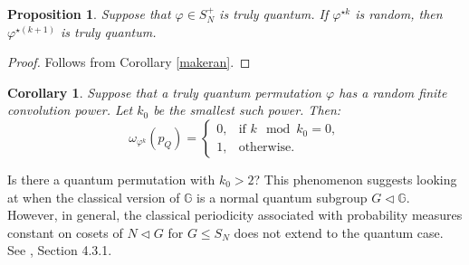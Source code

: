 \documentclass[12pt]{amsart}
\newtheorem{proposition}[theorem]{Proposition}
\newtheorem{corollary}[theorem]{Corollary}
\theoremstyle{remark}
\theoremstyle{remark}
\begin{document}
\begin{proposition}
Suppose that $\varphi\in S_N^+$ is truly quantum. If $\varphi^{\star k}$ is  random, then $\varphi^{\star (k+1)}$ is truly quantum.
\end{proposition}
\begin{proof}
Follows from Corollary \ref{makeran}.
\end{proof}
\begin{corollary}
Suppose that a truly quantum permutation $\varphi$ has a random finite convolution power. Let $k_0$ be the smallest such power. Then:
$$\omega_{\varphi^{k}}(p_Q)=\begin{cases}
                              0, & \mbox{if } k\mod k_0=0, \\
                              1, & \mbox{otherwise}.
                            \end{cases}$$
\end{corollary}
Is there a quantum permutation with $k_0>2$? This phenomenon suggests looking at when the classical version of $\mathbb{G}$ is a normal quantum subgroup $G\lhd \mathbb{G}$. However, in general, the classical periodicity associated with probability measures constant on cosets of $N\lhd G$ for $G\leq S_N$ does not extend to the quantum case. See \cite{mc1}, Section 4.3.1.
\end{document}
